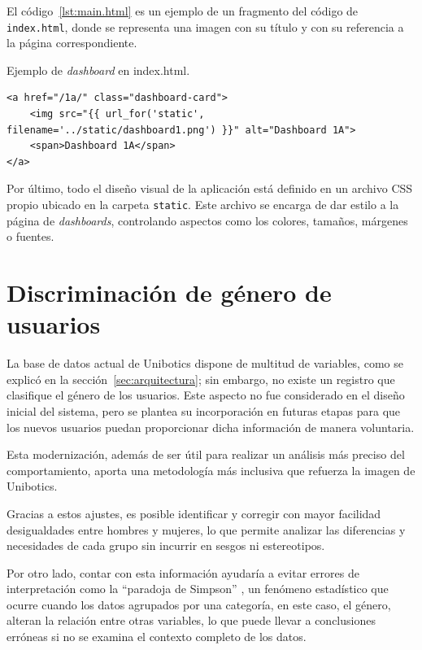 \documentclass[a4paper, 12pt]{book}
\begin{document}
El código~\ref{lst:main.html} es un ejemplo de un fragmento del código de \texttt{index.html}, donde se representa una imagen con su título y con su referencia a la página correspondiente.

\begin{listing}[h!]
\caption{Ejemplo de \textit{dashboard} en index.html.}
\label{lst:main.html}
\begin{verbatim}
<a href="/1a/" class="dashboard-card">
    <img src="{{ url_for('static', filename='../static/dashboard1.png') }}" alt="Dashboard 1A">
    <span>Dashboard 1A</span>
</a>
\end{verbatim}
\end{listing}

Por último, todo el diseño visual de la aplicación está definido en un archivo CSS propio ubicado en la carpeta \texttt{static}. Este archivo se encarga de dar estilo a la página de \textit{dashboards}, controlando aspectos como los colores, tamaños, márgenes o fuentes.

\section{Discriminación de género de usuarios}

La base de datos actual de Unibotics dispone de multitud de variables, como se explicó en la sección~\ref{sec:arquitectura}; sin embargo, no existe un registro que clasifique el género de los usuarios. Este aspecto no fue considerado en el diseño inicial del sistema, pero se plantea su incorporación en futuras etapas para que los nuevos usuarios puedan proporcionar dicha información de manera voluntaria.

Esta modernización, además de ser útil para realizar un análisis más preciso del comportamiento, aporta una metodología más inclusiva que refuerza la imagen de Unibotics.

Gracias a estos ajustes, es posible identificar y corregir con mayor facilidad desigualdades entre hombres y mujeres, lo que permite analizar las diferencias y necesidades de cada grupo sin incurrir en sesgos ni estereotipos.

Por otro lado, contar con esta información ayudaría a evitar errores de interpretación como la “paradoja de Simpson” \cite{simpsonParadoxWikipedia}, un fenómeno estadístico que ocurre cuando los datos agrupados por una categoría, en este caso, el género, alteran la relación entre otras variables, lo que puede llevar a conclusiones erróneas si no se examina el contexto completo de los datos.
\end{document}
